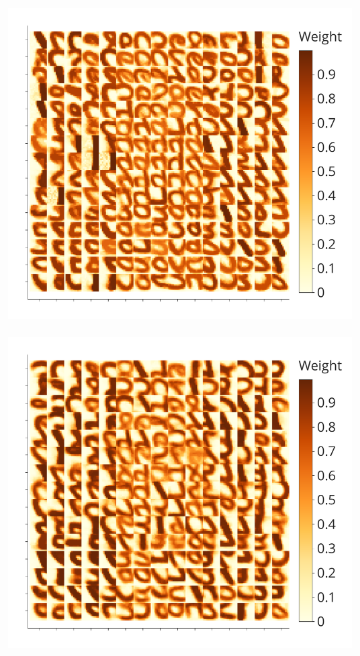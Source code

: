 \documentclass[a4paper,10pt]{article}
\begin{document}
\begin{figure}[H]
\begin{subfigure}{0.3\textwidth}
    \includegraphics[width=\textwidth,keepaspectratio=true]{weights_XY_clamp_low.pdf}
    \caption{}
    \label{fig:compe_clamp:low_weights}
\end{subfigure} 
\begin{subfigure}{0.3\textwidth} 
    \includegraphics[width=\textwidth,keepaspectratio=true]{weights_XY_clamp_high.pdf}
    \caption{}
    \label{fig:compe_clamp:high_weights}

\end{subfigure}
\end{figure}
\end{document}
